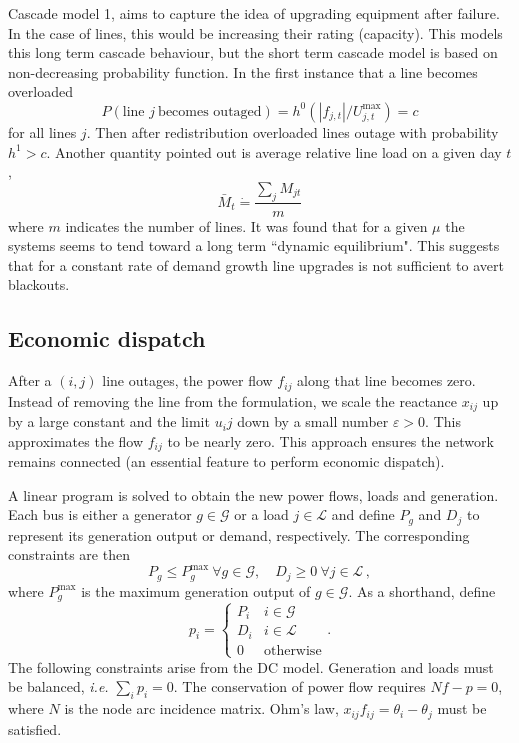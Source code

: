 \documentclass{article}
\newcommand{\ie}{\textit{i.e. }}
\newcommand{\e}{\varepsilon}
\newcommand{\mc}{\mathcal}
\renewcommand{\t}{\text}
\begin{document}
Cascade model 1, aims to capture the idea of upgrading equipment after failure. In the case of lines, this would be increasing their rating (capacity). This models this long term cascade behaviour, but the short term cascade model is based on non-decreasing probability function. In the first instance that a line becomes overloaded
\begin{equation}
P(\text{line } j \ \text{becomes outaged}) = h^0(|f_{j,t}|/U_{j,t}^{\text{max}})=c
\end{equation}
for all lines $j$. Then after redistribution overloaded lines outage with probability $h^1>c$. Another quantity pointed out is average relative line load on a given day $t$,
\begin{equation}
\bar{M}_t \dot{=}\frac{\sum_j M_{jt}}{m}
\end{equation}
where $m$ indicates the number of lines. It was found that for a given $\mu$ the systems seems to tend toward a long term ``dynamic equilibrium". This suggests that for a constant rate of demand growth line upgrades is not sufficient to avert blackouts.\\

\subsection{Economic dispatch}

After a $(i,j)$ line outages, the power flow $f_{ij}$ along that line becomes zero. Instead of removing the line from the formulation, we scale the reactance $x_{ij}$ up by a large constant and the limit $u_ij$ down by a small number $\e>0$. This approximates the flow $f_{ij}$ to be nearly zero. This approach ensures the network remains connected (an essential feature to perform economic dispatch). 

A linear program is solved to obtain the new power flows, loads and generation. Each bus is either a generator $g\in \mc G$ or a load $j\in \mc L$ and define $P_g$ and $D_j$ to represent its generation output or demand, respectively. The corresponding constraints are then
\[P_g \le P_g^{\t{max}} \ \forall g\in \mc G, \quad D_j \ge 0 \ \forall j\in \mc L\,,\]
 where $P_g^{\t{max}}$ is the maximum generation output of $g\in \mc G$. As a shorthand, define 
 \[p_i = \begin{cases}P_i & i\in \mc G\\ D_i & i\in \mc L\\ 0 & \t{otherwise} \end{cases}.\]
 The following constraints arise from the DC model. Generation and loads must be balanced, \ie $\sum_i p_i =0$. The conservation of power flow requires $Nf-p=0$, where $N$ is the node arc incidence matrix. Ohm's law, $x_{ij}f_{ij} = \theta_i-\theta_j$ must be satisfied. 
\end{document}
